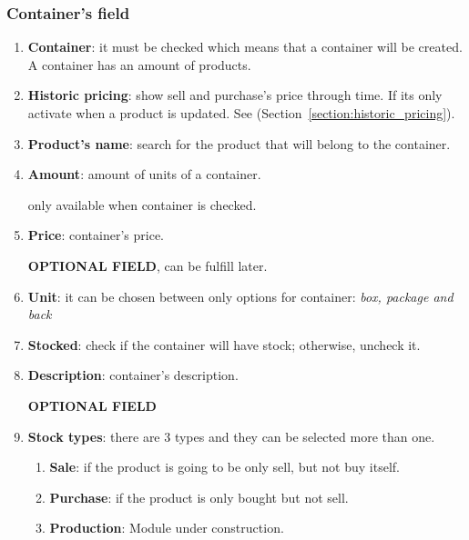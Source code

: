 \documentclass[a4paper,11pt]{refart}
\newcommand\InConstruction{\color{red} Module under construction.}
\begin{document}
\subsubsection{Container's field}
\begin{enumerate}
	\item \textbf{Container}: it must be checked which means that a container will be created. A container has an amount of products.
	\item \textbf{Historic pricing}: show sell and purchase's price through time. If its only activate when a product is updated. See (Section~\ref{section:historic_pricing}).
	\item \textbf{Product's name}: search for the product that will belong to the container.
	\item \textbf{Amount}: amount of units of a container.
		\medskip
		\begin{leftbar}
			only available when container is checked.
		\end{leftbar}
	\item \textbf{Price}:  container's price.
		\medskip
		\begin{leftbar}
			\textbf{OPTIONAL FIELD}, can be fulfill later.
		\end{leftbar}
	\item \textbf{Unit}: it can be chosen between only options for container: \emph{box, package and back}
	\item \textbf{Stocked}: check if the container will have stock; otherwise, uncheck it.
	\item \textbf{Description}: container's description.
	\medskip
		\begin{leftbar}
			\textbf{OPTIONAL FIELD}
		\end{leftbar}
	\item \textbf{Stock types}: there are 3 types and they can be selected more than one.
		\begin{enumerate}
			\item \textbf{Sale}: if the product is going to be only sell, but not buy itself.
			\item \textbf{Purchase}: if the product is only bought but not sell.
			\item \textbf{Production}:  \InConstruction{}
		\end{enumerate}
	

\end{enumerate}
\end{document}
